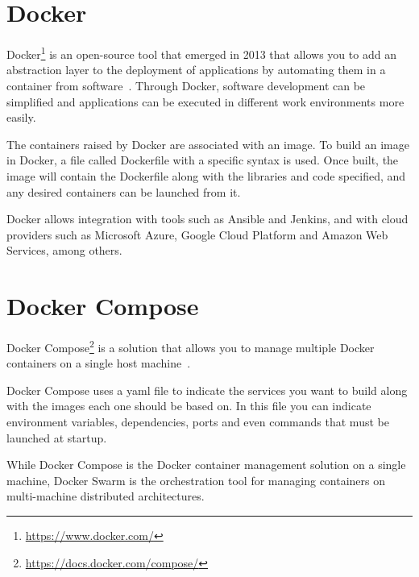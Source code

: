 \section{Docker}

\nonzeroparskip Docker\footnote{\url{https://www.docker.com/}} is an open-source tool that emerged in 2013 that allows you to add an abstraction layer to the deployment of applications by automating them in a container from software~\cite{docker}. Through Docker, software development can be simplified and applications can be executed in different work environments more easily.

\nonzeroparskip The containers raised by Docker are associated with an image. To build an image in Docker, a file called Dockerfile with a specific syntax is used. Once built, the image will contain the Dockerfile along with the libraries and code specified, and any desired containers can be launched from it.

\nonzeroparskip Docker allows integration with tools such as Ansible and Jenkins, and with cloud providers such as Microsoft Azure, Google Cloud Platform and Amazon Web Services, among others.

\section{Docker Compose}

\nonzeroparskip Docker Compose\footnote{\url{https://docs.docker.com/compose/}} is a solution that allows you to manage multiple Docker containers on a single host machine~\cite{docker_compose}.

\nonzeroparskip Docker Compose uses a yaml file to indicate the services you want to build along with the images each one should be based on. In this file you can indicate environment variables, dependencies, ports and even commands that must be launched at startup.

\nonzeroparskip While Docker Compose is the Docker container management solution on a single machine, Docker Swarm is the orchestration tool for managing containers on multi-machine distributed architectures.
